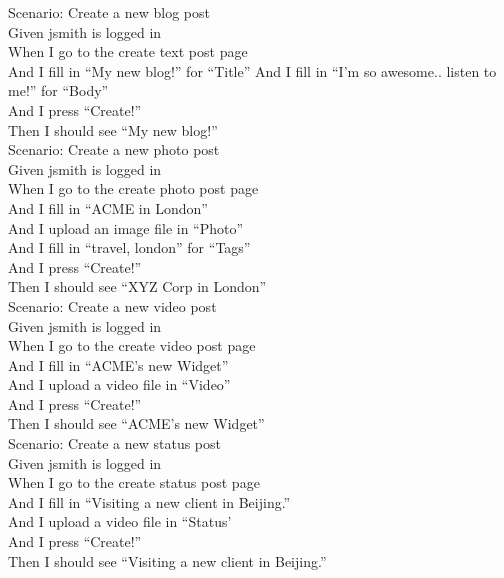 \documentclass[12pt]{article}
\begin{document}
Scenario: Create a new blog post \\
  Given jsmith is logged in \\
  When I go to the create text post page \\
  And I fill in ``My new blog!'' for ``Title''
  And I fill in ``I'm so awesome.. listen to me!'' for ``Body'' \\
  And I press ``Create!'' \\
  Then I should see ``My new blog!'' \\
  
Scenario: Create a new photo post \\
  Given jsmith is logged in \\
  When I go to the create photo post page \\
  And I fill in ``ACME in London'' \\
  And I upload an image file in ``Photo'' \\
  And I fill in ``travel, london'' for ``Tags'' \\
  And I press ``Create!'' \\
  Then I should see ``XYZ Corp in London'' \\
  
  Scenario: Create a new video post \\
    Given jsmith is logged in \\
    When I go to the create video post page \\
    And I fill in ``ACME's new Widget'' \\
    And I upload a video file in ``Video'' \\
    And I press ``Create!'' \\
    Then I should see ``ACME's new Widget'' \\
  
  Scenario: Create a new status post \\
    Given jsmith is logged in \\
    When I go to the create status post page \\
    And I fill in ``Visiting a new client in Beijing.'' \\
    And I upload a video file in ``Status' \\
    And I press ``Create!'' \\
    Then I should see ``Visiting a new client in Beijing.'' \\
\end{document}
